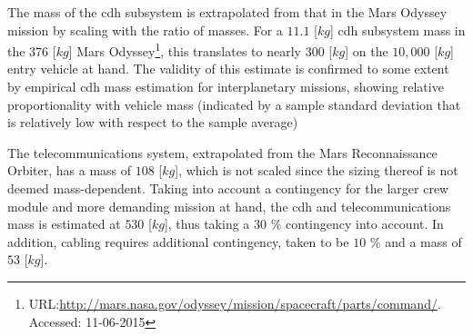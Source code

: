 The mass of the \gls{cdh} subsystem is extrapolated from that in the Mars Odyssey mission by scaling with the ratio of masses. For a $11.1$ [$kg$] \gls{cdh} subsystem mass in the 376 [$kg$] Mars Odyssey\footnote{URL:\url{http://mars.nasa.gov/odyssey/mission/spacecraft/parts/command/}. Accessed: 11-06-2015}, this translates to nearly $300$ [$kg$] on the $10,000$ [$kg$] entry vehicle at hand. The validity of this estimate is confirmed to some extent by empirical \gls{cdh} mass estimation for interplanetary missions, showing relative proportionality with vehicle mass (indicated by a sample standard deviation that is relatively low with respect to the sample average) \cite[p.953]{Wertz2011}

The telecommunications system, extrapolated from the Mars Reconnaissance Orbiter, has a mass of $108$ [$kg$], which is not scaled since the sizing thereof is not deemed mass-dependent. Taking into account a contingency for the larger crew module and more demanding mission at hand, the \gls{cdh} and telecommunications mass is estimated at $530$ [$kg$], thus taking a $30$ $\%$ contingency into account. In addition, cabling requires additional contingency, taken to be $10$ $\%$ and a mass of $53$ [$kg$].
